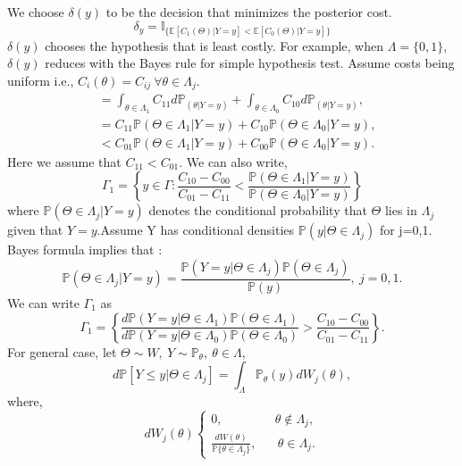 \documentclass[a4paper,english,12pt]{article}
\begin{document}
We choose $\delta (y)$ to be the decision that minimizes the posterior cost.
\begin{equation}
\delta_y =\mathbb{I}_{\{\mathbb{E}[C_1(\Theta) | Y=y] < \mathbb{E}[C_0(\Theta) | Y=y]\}}
\end{equation} 
$\delta (y)$ chooses the hypothesis that is least costly. For example, when $\Lambda =\{0,1\}$, $\delta (y)$ reduces with the Bayes rule for simple hypothesis test. Assume costs being uniform i.e., $ C_i (\theta) = C_{ij}~\forall\theta \in \Lambda_j $.
\begin{align}
&=\int_{\theta \in \Lambda_1} C_{11} d\mathbb{P}_{(\theta | Y=y)} +  \int_{\theta \in \Lambda_0} C_{10} d\mathbb{P}_{(\theta | Y=y)},\\\nonumber
&=C_{11} \mathbb{P}(\Theta \in \Lambda_1  | Y=y)  + C_{10}  \mathbb{P}(\Theta \in \Lambda_0  | Y=y),\\\nonumber
&< C_{01} \mathbb{P}(\Theta \in \Lambda_1  | Y=y)+C_{00}  \mathbb{P}(\Theta \in \Lambda_0  | Y=y).
\end{align}
Here we assume that $ C_{11} < C_{01}$. We can also write,
\begin{equation}
\Gamma_1 =\left\{y\in \Gamma : \frac{C_{10}-C_{00}}{C_{01}-C_{11}} < \frac{\mathbb{P}(\Theta \in \Lambda_1  | Y=y)}{\mathbb{P}(\Theta \in \Lambda_0  | Y=y)} \right\}
\end{equation}
where $\mathbb{P}(\Theta \in \Lambda_j  | Y=y)$ denotes the conditional probability that $\Theta$ lies in $\Lambda_j$ given that $Y=y$.Assume Y has conditional densities $\mathbb{P} (y | \Theta \in \Lambda_j)$ for j=0,1. Bayes formula implies that : 
\begin{equation}
\mathbb{P} ( \Theta \in \Lambda_j | Y=y) = \frac{{\mathbb{P} (Y=y | \Theta \in \Lambda_j)}{\mathbb{P}(\Theta \in \Lambda_j)}}{\mathbb{P}(y)},~j=0,1.
\end{equation}
We can write $\Gamma_1$ as 
\begin{equation}
\Gamma_1 =\left\{ \frac{{d\mathbb{P} (Y=y | \Theta \in \Lambda_1)}{\mathbb{P}(\Theta \in \Lambda_1)}}{{d\mathbb{P} (Y=y | \Theta \in \Lambda_0)}{\mathbb{P}(\Theta \in \Lambda_0)}} > \frac{C_{10}-C_{00}}{C_{01}-C_{11}}\right\}.
\end{equation}
For general case, let $\Theta \sim W,~Y\sim \mathbb{P}_\theta,~\theta \in \Lambda $,
\begin{equation}
d\mathbb{P}[Y\leq y | \Theta \in \Lambda_j] = \int_\Lambda {\mathbb{P}_\theta(y) dW_j(\theta)},
\end{equation}
where,
\begin{equation}
dW_j(\theta)\begin{cases}
0,\hspace{50pt}\theta \notin \Lambda_j,\\
\frac{dW(\theta)}{\mathbb{P}\{\theta \in \Lambda_j\}},\hspace{20pt}\theta \in \Lambda_j.
\end{cases}
\end{equation}
\end{document}
